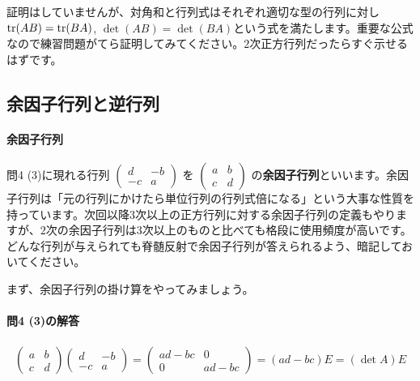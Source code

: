 証明はしていませんが、対角和と行列式はそれぞれ適切な型の行列に対し$\operatorname{tr} (AB) = \operatorname{tr} (BA)$, $\det (AB) = \det (BA)$という式を満たします。重要な公式なので練習問題がてら証明してみてください。$2$次正方行列だったらすぐ示せるはずです。

\subsection{余因子行列と逆行列}

\paragraph{余因子行列}
問4 (3)に現れる行列
$\begin{pmatrix}
d & -b \\
-c & a
\end{pmatrix}$
を
$\begin{pmatrix}
a & b \\
c & d
\end{pmatrix}$
の\textbf{余因子行列}といいます。余因子行列は「元の行列にかけたら単位行列の行列式倍になる」という大事な性質を持っています。次回以降$3$次以上の正方行列に対する余因子行列の定義もやりますが、$2$次の余因子行列は$3$次以上のものと比べても格段に使用頻度が高いです。どんな行列が与えられても脊髄反射で余因子行列が答えられるよう、暗記しておいてください。

まず、余因子行列の掛け算をやってみましょう。

\paragraph{問4 (3)の解答}
\begin{align*}
\begin{pmatrix}
a & b \\
c & d
\end{pmatrix}
\begin{pmatrix}
d & -b \\
-c & a
\end{pmatrix}
=
\begin{pmatrix}
ad-bc & 0 \\
0 & ad-bc
\end{pmatrix}
=
(ad-bc)E
= (\det A) E
\end{align*}

